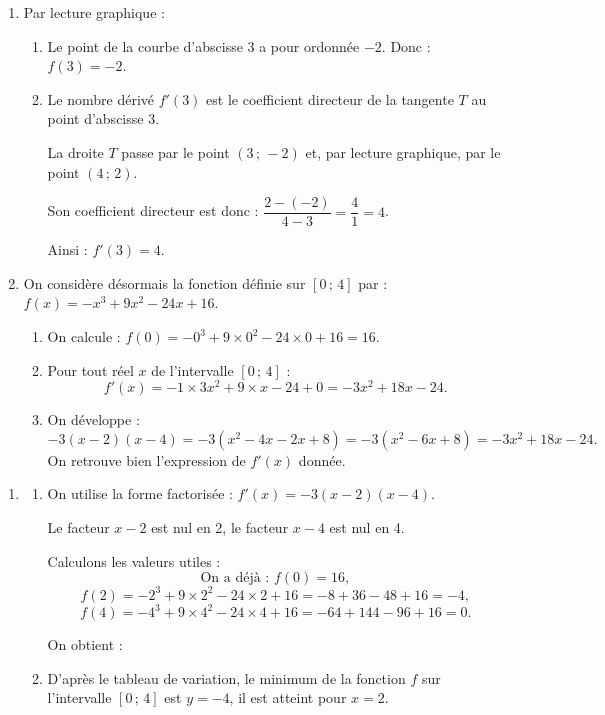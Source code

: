 \begin{enumerate}
\item Par lecture graphique :
\begin{enumerate}
\item Le point de la courbe d'abscisse 3 a pour ordonnée $-2$. Donc : $f(3)=-2$.

\item Le nombre dérivé $f'(3)$ est le coefficient directeur de la tangente $T$ au point d'abscisse 3.

La droite $T$ passe par le point $(3\,;\,-2)$ et, par lecture graphique, par le point $(4\,;\,2)$. 

Son coefficient directeur est donc : $\dfrac{2-(-2)}{4-3}=\dfrac{4}{1}=4$.

Ainsi : $f'(3)=4$.

\end{enumerate}

\item On considère désormais la fonction définie sur $[0\,;\,4]$ par : $f(x)=-x^3+9x^2-24x+16$.

\begin{enumerate}
\item On calcule : $f(0)=-0^3+9\times 0^2-24\times 0+16=16$.

\item Pour tout réel $x$ de l'intervalle $[0\,;\,4]$ :
\[f'(x)=-1\times3x^2+9\times x-24+0=-3x^2+18x-24.\]

\item On développe :
\[-3(x-2)(x-4)=-3(x^2-4x-2x+8)=-3(x^2-6x+8)=-3x^2+18x-24.\]
On retrouve bien l'expression de $f'(x)$ donnée.
\end{enumerate}
\end{enumerate}

\begin{enumerate}
\item[]
\begin{enumerate}[start=4]
\item On utilise la forme factorisée : $f'(x)=-3(x-2)(x-4)$.

Le facteur $x-2$ est nul en 2, le facteur $x-4$ est nul en 4.

Calculons les valeurs utiles :
\[\text{On a déjà : } f(0)=16,\]
\[f(2)=-2^3+9\times 2^2-24\times 2+16=-8+36-48+16=-4,\]
\[f(4)=-4^3+9\times 4^2-24\times 4+16=-64+144-96+16=0.\]

On obtient :

\begin{center}
\end{center}

\item D'après le tableau de variation, le minimum de la fonction $f$ sur l'intervalle $[0\,;\,4]$ est $y=-4$, il est atteint pour $x=2$.

\end{enumerate}
\end{enumerate}

